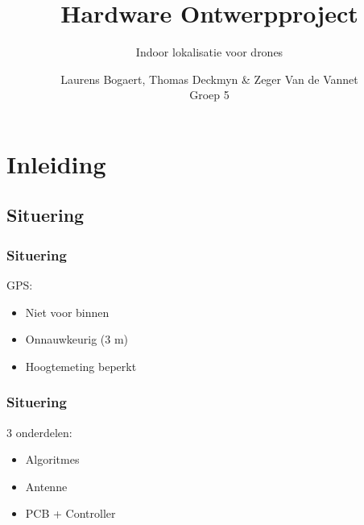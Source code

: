 \documentclass{beamer}
\title{\textbf{Hardware Ontwerpproject}}
\subtitle{Indoor lokalisatie voor drones}
\author{Laurens Bogaert, Thomas Deckmyn \& Zeger Van de Vannet\\Groep 5}
\begin{document}
\begin{frame}
  \titlepage
\end{frame}

\section{Inleiding}
\subsection{Situering}
  \begin{frame}
    \frametitle{Situering}
    GPS:
    \begin{itemize}
        \item Niet voor binnen
        \item Onnauwkeurig (3 m)
        \item Hoogtemeting beperkt
    \end{itemize}
  \end{frame}
  \begin{frame}
    \frametitle{Situering}
    3 onderdelen:
    \begin{itemize}
      \item Algoritmes
      \item Antenne
      \item PCB + Controller
    \end{itemize}
  \end{frame}
\end{document}
